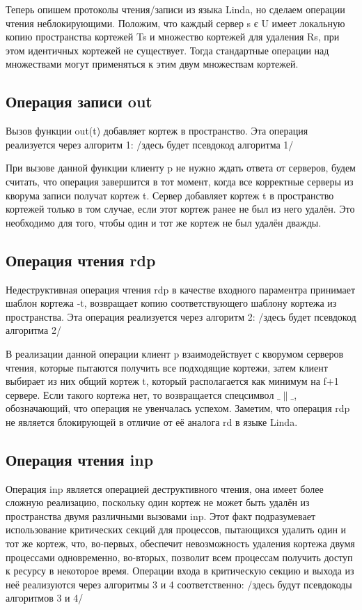 Теперь опишем протоколы чтения/записи из языка Linda, но сделаем операции чтения неблокирующими. Положим, что каждый сервер s є U имеет локальную копию пространства кортежей Ts и множество кортежей для удаления Rs, при этом идентичных кортежей не существует. Тогда стандартные операции над множествами могут применяться к этим двум множествам кортежей.

\subsection{Операция записи out}\label{subsec5:1}
Вызов функции out(t) добавляет кортеж в пространство. Эта операция реализуется через алгоритм 1: /здесь будет псевдокод алгоритма 1/

При вызове данной функции клиенту p не нужно ждать ответа от серверов, будем считать, что операция завершится в тот момент, когда все корректные серверы из кворума записи получат кортеж t. Сервер добавляет кортеж t в пространство кортежей только в том случае, если этот кортеж ранее не был из него удалён. Это необходимо для того, чтобы один и тот же кортеж не был удалён дважды.

\subsection{Операция чтения rdp}\label{subsec5:2}
Недеструктивная операция чтения rdp в качестве входного параментра принимает шаблон кортежа -t, возвращает копию соответствующего шаблону кортежа из пространства. Эта операция реализуется через алгоритм 2: /здесь будет псевдокод алгоритма 2/

В реализации данной операции клиент p взаимодействует с кворумом серверов чтения, которые пытаются получить все подходящие кортежи, затем клиент выбирает из них общий кортеж t, который располагается как минимум на f+1 сервере. Если такого кортежа нет, то возвращается спецсимвол $\_\|\_$, обозначающий, что операция не увенчалась успехом. Заметим, что операция rdp не является блокирующей в отличие от её аналога rd в языке Linda.

\subsection{Операция чтения inp}\label{subsec5:3}
Операция inp является операцией деструктивного чтения, она имеет более сложную реализацию, поскольку один кортеж не может быть удалён из пространства двумя различными вызовами inp. Этот факт подразумевает использование критических секций для процессов, пытающихся удалить один и тот же кортеж, что, во-первых, обеспечит невозможность удаления кортежа двумя процессами одновременно, во-вторых, позволит всем процессам получить доступ к ресурсу в некоторое время. Операции входа в критическую секцию и выхода из неё реализуются через алгоритмы 3 и 4 соответственно: /здесь будут псевдокоды алгоритмов 3 и 4/

